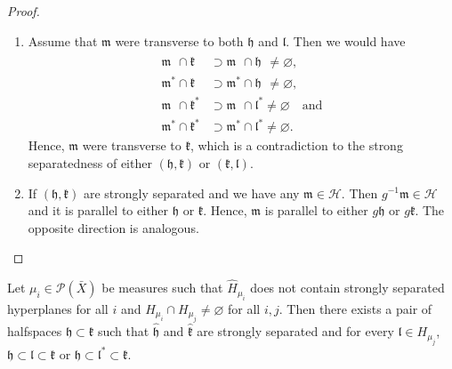 \begin{proof}
  \begin{enumerate}
  \item Assume that \(\mathfrak{m}\) were transverse to both \(\mathfrak{h}\) and \(\mathfrak{l}\). Then we would have
    \begin{align*}
      \mathfrak{m}^{\phantom{\ast}} \cap \mathfrak{k}^{\phantom{\ast}} & \supset \mathfrak{m}^{\phantom{\ast}} \cap \mathfrak{h}^{\phantom{\ast}} \neq \varnothing,\\
      \mathfrak{m}^\ast \cap \mathfrak{k}^{\phantom{\ast}}  & \supset \mathfrak{m}^\ast \cap \mathfrak{h}^{\phantom{\ast}} \neq \varnothing,\\
      \mathfrak{m}^{\phantom{\ast}} \cap \mathfrak{k}^\ast & \supset \mathfrak{m}^{\phantom{\ast}} \cap \mathfrak{l}^\ast \neq \varnothing\quad \text{and}\\
      \mathfrak{m}^\ast \cap \mathfrak{k}^\ast & \supset \mathfrak{m}^\ast \cap \mathfrak{l}^\ast \neq \varnothing.
    \end{align*}
    Hence, \(\mathfrak{m}\) were transverse to \(\mathfrak{k}\), which is a contradiction to the strong separatedness of either \((\mathfrak{h}, \mathfrak{k})\) or \((\mathfrak{k}, \mathfrak{l})\).
  \item If \((\mathfrak{h}, \mathfrak{k})\) are strongly separated and we have any \(\mathfrak{m} \in \mathcal{H}\). Then \(g^{-1}\mathfrak{m} \in \mathcal{H}\) and it is parallel to either \(\mathfrak{h}\) or \(\mathfrak{k}\). Hence, \(\mathfrak{m}\) is parallel to either \(g\mathfrak{h}\) or \(g\mathfrak{k}\). The opposite direction is analogous.
  \end{enumerate}
\end{proof}

\begin{lemma}[{\cite[Lemma~4.20]{MR3509968}}]
  \label{lem:4.20}
  Let \(\mu_i \in \mathcal{P}(\bar X)\) be measures such that \(\hat H_{\mu_i}\) does not contain strongly separated hyperplanes for all \(i\) and \(H_{\mu_i} \cap H_{\mu_j} \neq \varnothing\) for all \(i,j\). Then there exists a pair of halfspaces \(\mathfrak{h} \subset \mathfrak{k}\) such that \(\mathfrak{\hat h}\) and \(\mathfrak{\hat k}\) are strongly separated and for every \(\mathfrak{l} \in H_{\mu_j}\), \(\mathfrak{h} \subset \mathfrak{l} \subset \mathfrak{k}\) or \(\mathfrak{h} \subset \mathfrak{l}^\ast \subset \mathfrak{k}\).
\end{lemma}

